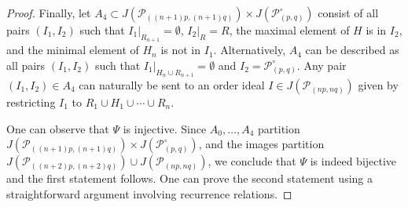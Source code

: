 \documentclass{article}
\theoremstyle{remark}
\newcommand{\calP}{\mathcal{P}}
\begin{document}
\begin{proof}
Finally, let $A_4 \subset J(\calP_{((n+1)p,(n+1)q)}) \times J(\calP^\circ_{(p,q)})$ consist of all pairs $(I_1,I_2)$ such that $I_1 \vert_{R_{n+1}} = \emptyset$, $I_2 \vert_R = R$, the maximal element of $H$ is in $I_2$, and the minimal element of $H_n$ is not in $I_1$. Alternatively, $A_4$ can be described as all pairs $(I_1,I_2)$ such that  $I_1 \vert_{H_n \cup R_{n+1}} = \emptyset$ and $I_2 = \calP^\circ_{(p,q)}$. Any pair $(I_1,I_2) \in A_4$ can naturally be sent to an order ideal $I \in J(\calP_{(np,nq)})$ given by restricting $I_1$ to $R_1 \cup H_1 \cup \cdots \cup R_n$.

One can observe that $\Psi$ is injective. Since $A_0,\ldots,A_4$ partition $J(\calP_{((n+1)p,(n+1)q)}) \times J(\calP^\circ_{(p,q)})$, and the images partition $J(\calP_{((n+2)p,(n+2)q)}) \cup J(\calP_{(np,nq)})$, we conclude that $\Psi$ is indeed bijective and the first statement follows. One can prove the second statement using a straightforward argument involving recurrence relations.
\end{proof}
\end{document}
